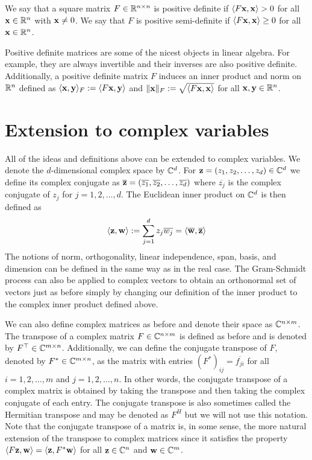 \begin{definition}
    We say that a square matrix $F \in \mathbb{R}^{n \times n}$ is positive definite if $\langle F \mathbf{x}, \mathbf{x} \rangle > 0$ for all $\mathbf{x} \in \mathbb{R}^n$ with $\mathbf{x} \neq 0$. We say that $F$ is positive semi-definite if $\langle F \mathbf{x}, \mathbf{x} \rangle \ge 0$ for all $\mathbf{x} \in \mathbb{R}^n$.
\end{definition}

Positive definite matrices are some of the nicest objects in linear algebra. For example, 
they are always invertible and their inverses are also positive definite. Additionally, 
a positive definite matrix $F$ induces an inner product and norm on $\mathbb{R}^n$ defined as $\langle \mathbf{x}, \mathbf{y} \rangle_F := \langle F \mathbf{x}, \mathbf{y} \rangle$ and $\|\mathbf{x}\|_F := \sqrt{\langle F \mathbf{x}, \mathbf{x} \rangle}$ for all $\mathbf{x}, \mathbf{y} \in \mathbb{R}^n$.

\section{Extension to complex variables}

All of the ideas and definitions above can be extended to complex variables. We denote the $d$-dimensional complex space by $\mathbb{C}^d$. For $\mathbf{z} = (z_1, z_2, \ldots, z_d) \in \mathbb{C}^d$ we define its complex conjugate as $\overline{\mathbf{z}} = (\overline{z_1}, \overline{z_2}, \ldots, \overline{z_d})$ where $\overline{z_j}$ is the complex conjugate of $z_j$ for $j=1,2,\ldots,d$. The Euclidean inner product on $\mathbb{C}^d$ is then defined as 
\begin{equation*}
    \langle \mathbf{z}, \mathbf{w} \rangle := \sum_{j=1}^d z_j \overline{w_j} = \langle \overline{\mathbf{w}}, \overline{\mathbf{z}} \rangle
\end{equation*}
The notions of norm, orthogonality, linear independence, span, basis, and dimension can be defined in the same way as in the real case. The Gram-Schmidt process can also be applied to complex vectors to obtain an orthonormal set of vectors just as before simply by 
changing our definition of the inner product to the complex inner product defined above.

We can also define complex matrices as before and denote their space as $\mathbb{C}^{n \times m}$. The transpose of a complex matrix $F \in \mathbb{C}^{n \times m}$ is defined as before and is denoted by $F^\top \in \mathbb{C}^{m \times n}$. Additionally, we can define the conjugate transpose of $F$, denoted by $F^* \in \mathbb{C}^{m \times n}$, as the matrix with entries $(F^*)_{ij} = \overline{f_{ji}}$ for all $i=1,2,\ldots,m$ and $j=1,2,\ldots,n$. In other words, the conjugate transpose of a complex matrix is obtained by taking the transpose and then taking the complex conjugate of each entry. The conjugate transpose is also sometimes called the Hermitian transpose and may be denoted as $F^H$ but we will not use this notation. Note that the conjugate transpose of a matrix 
is, in some sense, the more natural extension of the transpose to complex matrices since it satisfies the property $\langle F \mathbf{z}, \mathbf{w} \rangle = \langle \mathbf{z}, F^* \mathbf{w} \rangle$ for all $\mathbf{z} \in \mathbb{C}^n$ and $\mathbf{w} \in \mathbb{C}^m$.

